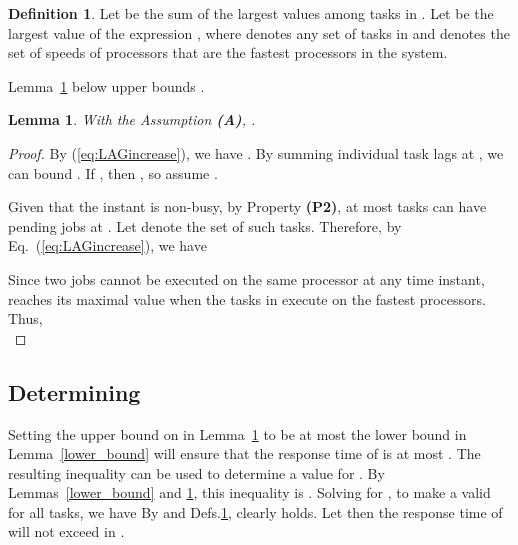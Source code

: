 \documentclass[Times, 10pt,twocolumn]{article}
\newtheorem{lemma}{\textbf{Lemma}}
\theoremstyle{definition}
\newtheorem{definition}{\textbf{Definition}}
\begin{document}
\begin{definition}
\label{def:UE}
Let  be the sum of the  largest  values among tasks in . Let  be the largest value of the expression , where  denotes any set of  tasks in  and  denotes the set of speeds of  processors that are the  fastest processors in the system.
\end{definition}

Lemma~\ref{lemma:Upper_lemma2} below upper bounds .

\begin{lemma}
\label{lemma:Upper_lemma2}
With the Assumption \textbf{(A)}, .
\end{lemma}
\begin{proof}

By (\ref{eq:LAGincrease}), we have . By summing individual task lags at , we can bound . If , then , so assume .


Given that the instant  is non-busy, by Property \textbf{(P2)}, at most  tasks can have pending jobs at . Let  denote the set of such tasks. Therefore, by Eq.~(\ref{eq:LAGincrease}), we have


Since two jobs cannot be executed on the same processor at any time instant,  reaches its maximal value when the   tasks in  execute on the  fastest processors. Thus, \\

\end{proof}












\subsection{Determining }
\label{sec:x}

Setting the upper bound on  in Lemma~\ref{lemma:Upper_lemma2} to be at most the lower bound in Lemma~\ref{lower_bound} will ensure that the response time of  is at most . The resulting inequality can be used to determine a value for . By Lemmas~\ref{lower_bound} and \ref{lemma:Upper_lemma2}, this inequality is . Solving for , to make a  valid for all tasks, we have 
 \vspace{-1mm}
By  and Defs.\ref{def:UE},  clearly holds. Let
 \vspace{-1mm} 
then the response time of  will not exceed  in . 
\end{document}
